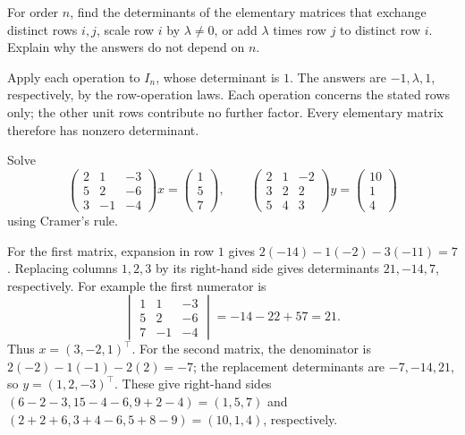 \begin{problem}\label{ex:07:elementary}
For order \(n\), find the determinants of the elementary matrices that
exchange distinct rows \(i,j\), scale row \(i\) by \(\lambda\ne0\), or
add \(\lambda\) times row \(j\) to distinct row \(i\).
Explain why the answers do not depend on \(n\).
\end{problem}
\begin{solution}
Apply each operation to \(I_n\), whose determinant is \(1\).
The answers are \(-1,\lambda,1\), respectively, by the row-operation
laws. Each operation concerns the stated rows only; the other unit
rows contribute no further factor. Every elementary matrix therefore
has nonzero determinant.
\end{solution}

\begin{problem}\label{ex:07:cramer-pair}
Solve
\[
 \begin{pmatrix}2&1&-3\\5&2&-6\\3&-1&-4\end{pmatrix}x
 =\begin{pmatrix}1\\5\\7\end{pmatrix},\qquad
 \begin{pmatrix}2&1&-2\\3&2&2\\5&4&3\end{pmatrix}y
 =\begin{pmatrix}10\\1\\4\end{pmatrix}
\]
using Cramer's rule.
\end{problem}
\begin{solution}
For the first matrix, expansion in row \(1\) gives
\(2(-14)-1(-2)-3(-11)=7\).
Replacing columns \(1,2,3\) by its right-hand side gives determinants
\(21,-14,7\), respectively. For example the first numerator is
\[
 \begin{vmatrix}1&1&-3\\5&2&-6\\7&-1&-4\end{vmatrix}
 =-14-22+57=21.
\]
Thus \(x=(3,-2,1)^\top\).
For the second matrix, the denominator is
\(2(-2)-1(-1)-2(2)=-7\);
the replacement determinants are \(-7,-14,21\), so \(y=(1,2,-3)^\top\).
These give right-hand sides
\((6-2-3,15-4-6,9+2-4)=(1,5,7)\) and
\((2+2+6,3+4-6,5+8-9)=(10,1,4)\), respectively.
\end{solution}

